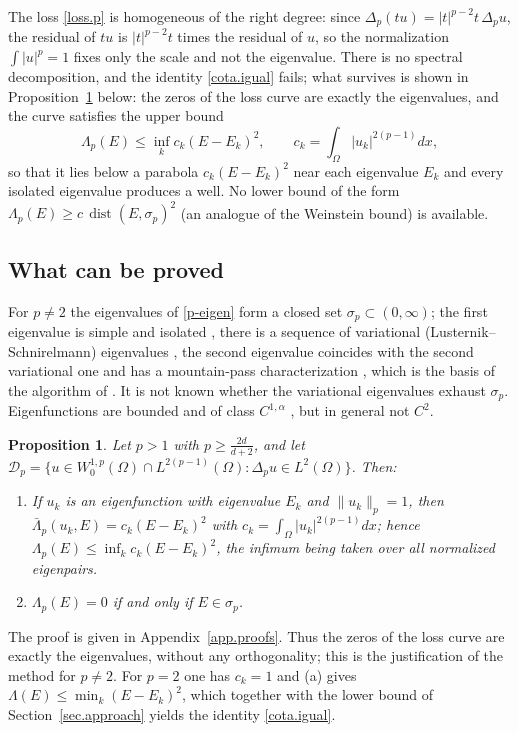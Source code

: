 \documentclass[10pt]{amsart}
\newenvironment{revblock}{\color{blue}}{}
\theoremstyle{definition}
\theoremstyle{remark}
\theoremstyle{plain}
\newtheorem{proposition}[theorem]{Proposition}
\DeclareMathOperator{\dist}{dist}
\begin{document}
\begin{revblock}
The loss \eqref{loss.p} is homogeneous of the right degree: since $\Delta_p(tu)=|t|^{p-2}t\,\Delta_pu$,
the residual of $tu$ is $|t|^{p-2}t$ times the residual of $u$, so the normalization $\int|u|^p=1$
fixes only the scale and not the eigenvalue. There is no spectral decomposition, and the identity
\eqref{cota.igual} fails; what survives is shown in Proposition~\ref{prop.plap} below: the zeros
of the loss curve are exactly the eigenvalues, and the curve satisfies the upper bound
\[
\Lambda_p(E)\le\inf_kc_k(E-E_k)^2,\qquad c_k=\int_\Omega|u_k|^{2(p-1)}dx,
\]
so that it lies below a parabola $c_k(E-E_k)^2$ near each eigenvalue $E_k$ and every isolated eigenvalue
produces a well. No lower bound of the form $\Lambda_p(E)\ge c\,\dist(E,\sigma_p)^2$ (an analogue of
the Weinstein bound) is available.

\subsection{What can be proved}
For $p\ne2$ the eigenvalues of \eqref{p-eigen} form a closed set $\sigma_p\subset(0,\infty)$; the
first eigenvalue is simple and isolated \cite{Anane1987,Lindqvist1990}, there is a sequence of
variational (Lusternik--Schnirelmann) eigenvalues \cite{GarciaAzorero-Peral}, the second
eigenvalue coincides with the second variational one \cite{Anane-Tsouli} and has a mountain-pass
characterization \cite{Cuesta-deFigueiredo-Gossez}, which is the basis of the algorithm of
\cite{HJ11}. It is not known whether the variational eigenvalues exhaust $\sigma_p$. Eigenfunctions
are bounded and of class $C^{1,\alpha}$ \cite{DiBenedetto,Tolksdorf}, but in general not $C^2$.

\begin{proposition}\label{prop.plap}
Let $p>1$ with $p\ge\frac{2d}{d+2}$, and let $\mathcal D_p=\{u\in W^{1,p}_0(\Omega)\cap
L^{2(p-1)}(\Omega)\colon\Delta_pu\in L^2(\Omega)\}$. Then:
\begin{enumerate}
\item[(a)] If $u_k$ is an eigenfunction with eigenvalue $E_k$ and $\|u_k\|_p=1$, then
$\bar\Lambda_p(u_k,E)=c_k(E-E_k)^2$ with $c_k=\int_\Omega|u_k|^{2(p-1)}dx$; hence
$\Lambda_p(E)\le\inf_kc_k(E-E_k)^2$, the infimum being taken over all normalized eigenpairs.
\item[(b)] $\Lambda_p(E)=0$ if and only if $E\in\sigma_p$.
\end{enumerate}
\end{proposition}
The proof is given in Appendix~\ref{app.proofs}. Thus the zeros of the loss curve are exactly the
eigenvalues, without any orthogonality; this is the justification of the method for $p\ne2$. For
$p=2$ one has $c_k=1$ and (a) gives $\Lambda(E)\le\min_k(E-E_k)^2$, which together with the lower
bound of Section~\ref{sec.approach} yields the identity \eqref{cota.igual}.


\end{revblock}
\end{document}
